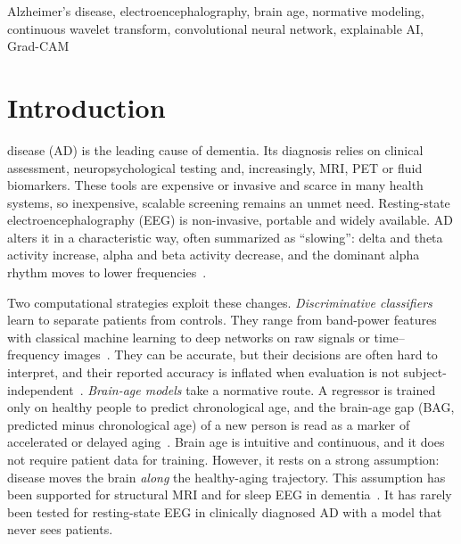 \documentclass[journal]{IEEEtran}
\begin{document}
\begin{IEEEkeywords}
Alzheimer's disease, electroencephalography, brain age, normative modeling, continuous wavelet transform, convolutional neural network, explainable AI, Grad-CAM
\end{IEEEkeywords}

\section{Introduction}
 disease (AD) is the leading cause of dementia. Its diagnosis relies on clinical assessment, neuropsychological testing and, increasingly, MRI, PET or fluid biomarkers. These tools are expensive or invasive and scarce in many health systems, so inexpensive, scalable screening remains an unmet need. Resting-state electroencephalography (EEG) is non-invasive, portable and widely available. AD alters it in a characteristic way, often summarized as ``slowing'': delta and theta activity increase, alpha and beta activity decrease, and the dominant alpha rhythm moves to lower frequencies~\cite{jeong2004,babiloni2020}.

Two computational strategies exploit these changes. \emph{Discriminative classifiers} learn to separate patients from controls. They range from band-power features with classical machine learning to deep networks on raw signals or time--frequency images~\cite{craik2019,roy2019}. They can be accurate, but their decisions are often hard to interpret, and their reported accuracy is inflated when evaluation is not subject-independent~\cite{roy2019,varoquaux2018}. \emph{Brain-age models} take a normative route. A regressor is trained only on healthy people to predict chronological age, and the brain-age gap (BAG, predicted minus chronological age) of a new person is read as a marker of accelerated or delayed aging~\cite{cole2017,franke2019}. Brain age is intuitive and continuous, and it does not require patient data for training. However, it rests on a strong assumption: disease moves the brain \emph{along} the healthy-aging trajectory. This assumption has been supported for structural MRI and for sleep EEG in dementia~\cite{sun2019}. It has rarely been tested for resting-state EEG in clinically diagnosed AD with a model that never sees patients.
\end{document}
